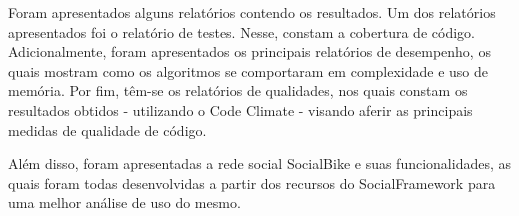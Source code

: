 Foram apresentados alguns relatórios contendo os resultados. Um dos relatórios apresentados foi o relatório de testes. Nesse, constam a cobertura de código. Adicionalmente, foram apresentados os principais relatórios de desempenho, os quais mostram como os algoritmos se comportaram em complexidade e uso de memória. Por fim, têm-se os relatórios de qualidades, nos quais constam os resultados obtidos - utilizando o Code Climate - visando aferir as principais medidas de qualidade de código.

Além disso, foram apresentadas a rede social SocialBike e suas funcionalidades, as quais foram todas desenvolvidas a partir dos recursos do SocialFramework para uma melhor análise de uso do mesmo.

